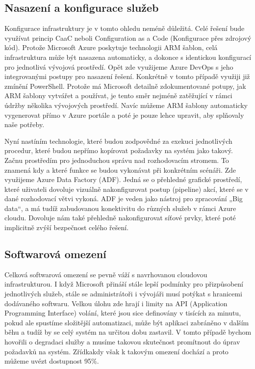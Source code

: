 \documentclass[12pt]{article}
\begin{document}
\begin{sloppypar}
\begin{spacing}{1.15}
        \subsection*{Nasazení a konfigurace služeb}
        Konfigurace infrastruktury je v tomto ohledu neméně důležitá. Celé
        řešení bude využívat princip CaaC neboli Configuration as a Code
        (Konfigurace přes zdrojový kód). Protože Microsoft Azure poskytuje
        technologii ARM šablon, celá infrastruktura může být nasazena
        automaticky, a dokonce s identickou konfigurací pro jednotlivá vývojová
        prostředí. Opět zde využijeme Azure DevOps s jeho integrovanými postupy
        pro nasazení řešení. Konkrétně v tomto případě využiji již zmínění
        PowerShell. Protože má Microsoft detailně zdokumentované potupy, jak ARM
        šablony vytvářet a používat, je tento směr nejméně zatěžující v rámci
        údržby několika vývojových prostředí. Navíc můžeme ARM šablony
        automaticky vygenerovat přímo v Azure portále a poté je pouze lehce
        upravit, aby splňovaly naše potřeby.  
        
        Nyní nastíním technologie, které budou zodpovědné za exekuci
        jednotlivých procedur, které budou nepřímo kopírovat požadavky na systém
        jako takový. Začnu  prostředím pro jednoduchou správu nad rozhodovacím
        stromem. To znamená kdy a které funkce se budou vykonávat při konkrétním
        scénáři. Zde využijeme Azure Data Factory (ADF). Jedná se o přehledné
        grafické prostředí, které uživateli dovoluje vizuálně nakonfigurovat
        postup (pipeline) akcí, které se v dané rozhodovací větvi vykoná. ADF je
        veden jako nástroj pro zpracování „Big data“, a má tudíž zabudovanou
        konektivitu do různých služeb v rámci Azure cloudu. Dovoluje nám také
        přehledně nakonfigurovat síťové prvky, které poté implicitně zvýší
        bezpečnost celého řešení.

        \subsection*{Softwarová omezení}
        Celková softwarová omezení se pevně váží s navrhovanou cloudovou
        infrastrukturou. I když Microsoft přináší stále lepší podmínky pro
        přizpůsobení jednotlivých služeb, stále se administrátoři i vývojáři musí
        potýkat s hranicemi dodávaného softwaru. Velkou úlohu zde hrají i limity
        na API (Application Programming Interface) volání, které jsou sice
        definovány v tisících za minutu, pokud ale spustíme složitější
        automatizaci, může být aplikaci zabráněno v dalším běhu a tudíž by se
        celý systém na určitou dobu zastavil. V tomto případě bychom hovořili o
        degradaci služby a musíme takovou skutečnost promítnout do úprav
        požadavků na systém. Zřídkakdy však k takovým omezení dochází a proto
        můžeme uvézt dostupnost 95\%.


\end{spacing}
\end{sloppypar}
\end{document}
